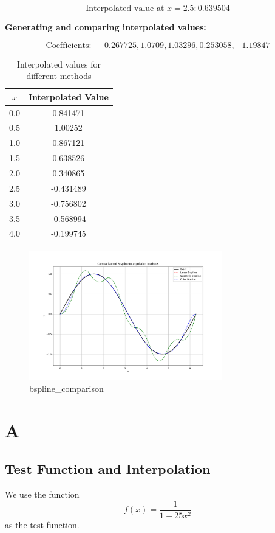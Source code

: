 \documentclass[a4paper]{article}
\begin{document}
\[
\text{Interpolated value at } x = 2.5: 0.639504
\]

\textbf{Generating and comparing interpolated values:}

\[
\text{Coefficients: } -0.267725, 1.0709, 1.03296, 0.253058, -1.19847
\]

\begin{table}[H]
\centering
\begin{tabular}{|c|c|}
\hline
$x$ & Interpolated Value \\
\hline
0.0 & 0.841471 \\
0.5 & 1.00252 \\
1.0 & 0.867121 \\
1.5 & 0.638526 \\
2.0 & 0.340865 \\
2.5 & -0.431489 \\
3.0 & -0.756802 \\
3.5 & -0.568994 \\
4.0 & -0.199745 \\
\hline
\end{tabular}
\caption{Interpolated values for different methods}
\end{table}

\begin{figure}[H]
    \centering
    \includegraphics[width=0.75\textwidth]{figure/bspline_comparison.png}
    \caption{bspline\_comparison}
    \label{fig:bspline_comparison}
\end{figure}

\section*{A}
\subsection*{Test Function and Interpolation}
We use the function
\[
f(x) = \frac{1}{1 + 25x^2}
\]
as the test function.
\end{document}
